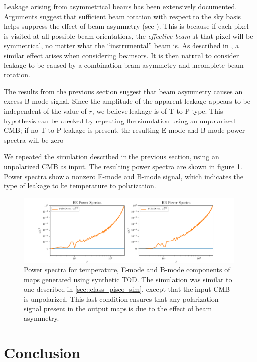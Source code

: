 \documentclass[a4paper,fleqn]{cas-dc}\sloppy
\begin{document}
Leakage arising from asymmetrical beams has been extensively documented. Arguments suggest that sufficient beam rotation with respect to the sky basis helps suppress the effect of beam asymmetry (see \cite{2003ApJS..148...39P}). This is because if each pixel is visited at all possible beam orientations, the \textsl{effective beam} at that pixel will be symmetrical, no matter what the ``instrumental'' beam is. As described in \cite{2007MNRAS.376.1767O}, a similar effect arises when considering beamsors. It is then natural to consider leakage to be caused by a combination beam asymmetry and incomplete beam rotation.

The results from the previous section suggest that beam asymmetry causes an excess B-mode signal. Since the amplitude of the apparent leakage appears to be independent of the value of $r$, we believe leakage is of T to P type. This hypothesis can be checked by repeating the simulation using an unpolarized CMB; if no T to P leakage is present, the resulting E-mode and B-mode power spectra will be zero.

We repeated the simulation described in the previous section, using an unpolarized CMB as input. The resulting power spectra are shown in figure  \ref{fig::classscan720circulargaussianbeamsr0d00extratonly}. Power spectra show a nonzero E-mode and B-mode signal, which indicates the type of leakage to be temperature to polarization.

\begin{figure}
	\centering
	\includegraphics[width=1.0\linewidth]{figures/T_to_P_leakage_for_class.pdf}
	\caption{Power spectra for temperature, E-mode and B-mode components of maps generated using synthetic TOD. The simulation was similar to one described in \ref{sec::class_pisco_sim}, except that the input CMB is unpolarized. This last condition ensures that any polarization signal present in the output maps is due to the effect of beam asymmetry.}
	\label{fig::classscan720circulargaussianbeamsr0d00extratonly}
\end{figure}


\section{Conclusion}
\end{document}
